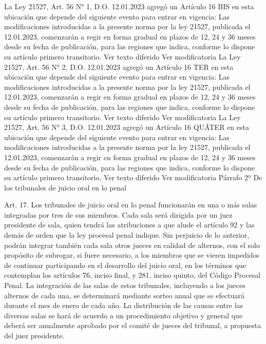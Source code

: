  La Ley 21527, Art. 56 N° 1, D.O. 12.01.2023 agregó un Artículo 16 BIS en esta ubicación que depende del siguiente evento para entrar en vigencia: Las modificaciones introducidas a la presente norma por la ley 21527, publicada el 12.01.2023, comenzarán a regir en forma gradual en plazos de 12, 24 y 36 meses desde su fecha de publicación, para las regiones que indica, conforme lo dispone su artículo primero transitorio.
Ver texto diferido
Ver modificatoria
 La Ley 21527, Art. 56 N° 2, D.O. 12.01.2023 agregó un Artículo 16 TER en esta ubicación que depende del siguiente evento para entrar en vigencia: Las modificaciones introducidas a la presente norma por la ley 21527, publicada el 12.01.2023, comenzarán a regir en forma gradual en plazos de 12, 24 y 36 meses desde su fecha de publicación, para las regiones que indica, conforme lo dispone su artículo primero transitorio.
Ver texto diferido
Ver modificatoria
 La Ley 21527, Art. 56 N° 3, D.O. 12.01.2023 agregó un Artículo 16 QUÁTER en esta ubicación que depende del siguiente evento para entrar en vigencia: Las modificaciones introducidas a la presente norma por la ley 21527, publicada el 12.01.2023, comenzarán a regir en forma gradual en plazos de 12, 24 y 36 meses desde su fecha de publicación, para las regiones que indica, conforme lo dispone su artículo primero transitorio.
Ver texto diferido
Ver modificatoria
    Párrafo 2º
    De los tribunales de juicio oral en lo penal




    Art. 17. Los tribunales de juicio oral en lo penal funcionarán en una o más salas integradas por tres de sus miembros.
    Cada sala será dirigida por un juez presidente de sala, quien tendrá las atribuciones a que alude el artículo 92 y las demás de orden que la ley procesal penal indique. Sin perjuicio de lo anterior, podrán integrar también cada sala otros jueces en calidad de alternos, con el solo propósito de subrogar, si fuere necesario, a los miembros que se vieren impedidos de continuar participando en el desarrollo del juicio oral, en los términos que contemplan los artículos 76, inciso final, y 281, inciso quinto, del Código Procesal Penal.
    La integración de las salas de estos tribunales, incluyendo a los jueces alternos de cada una, se determinará mediante sorteo anual que se efectuará durante el mes de enero de cada año.
    La distribución de las causas entre las diversas salas se hará de acuerdo a un procedimiento objetivo y general que deberá ser anualmente aprobado por el comité de jueces del tribunal, a propuesta del juez presidente.


